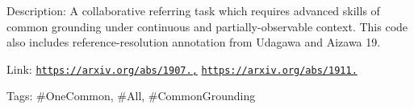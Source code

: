 Description\+: A collaborative referring task which requires advanced skills of common grounding under continuous and partially-\/observable context. This code also includes reference-\/resolution annotation from Udagawa and Aizawa \textquotesingle{}19.

Link\+: \href{https://arxiv.org/abs/1907.03399,}{\tt https\+://arxiv.\+org/abs/1907.,} \href{https://arxiv.org/abs/1911.07588}{\tt https\+://arxiv.\+org/abs/1911.}

Tags\+: \#\+One\+Common, \#\+All, \#\+Common\+Grounding 